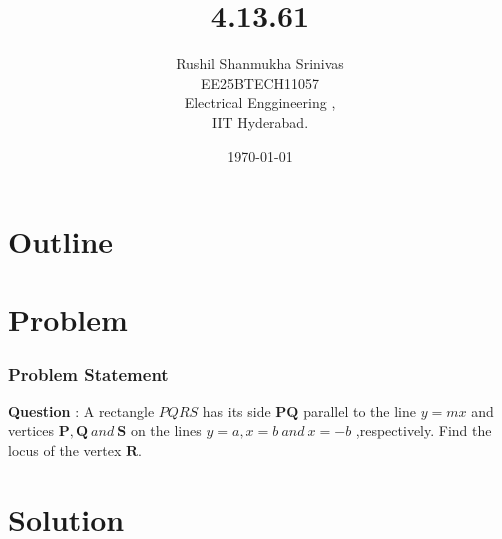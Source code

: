 \documentclass{beamer}
\title{4.13.61}
\author{Rushil Shanmukha Srinivas \\EE25BTECH11057 \\ Electrical Enggineering ,\\IIT Hyderabad.}
\date{\today}
\theoremstyle{remark}
\let\vec\mathbf
\numberwithin{equation}{section}
\begin{document}
 

\begin{frame}
\titlepage
\end{frame}

\section*{Outline}
\begin{frame}
\tableofcontents
\end{frame}
\section{Problem}
\begin{frame}
\frametitle{Problem Statement}
\textbf{Question} : 
A rectangle $PQRS$ has its side $\vec{P}\vec{Q}$ parallel to the line $y = mx$ and vertices $\vec{P}, \vec{Q} \ and \ \vec{S}$ on the lines $y = a, x = b \ and \ x = -b $ ,respectively. Find the locus of the vertex $\vec{R}$.


\end{frame}
\section{Solution}
\end{document}
